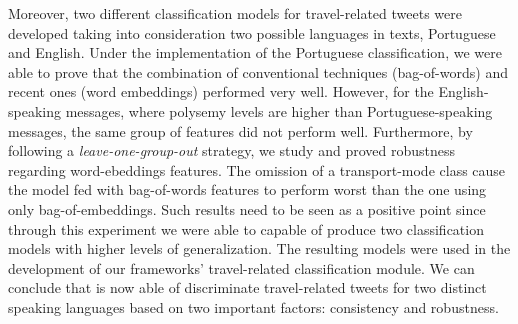 Moreover, two different classification models for travel-related tweets were developed taking into consideration two possible languages in texts, Portuguese and English. Under the implementation of the Portuguese classification, we were able to prove that the combination of conventional techniques (bag-of-words) and recent ones (word embeddings) performed very well. However, for the English-speaking messages, where polysemy levels are higher than Portuguese-speaking messages, the same group of features did not perform well. Furthermore, by following a \textit{leave-one-group-out} strategy, we study and proved robustness regarding word-ebeddings features. The omission of a transport-mode class cause the model fed with bag-of-words features to perform worst than the one using only bag-of-embeddings. Such results need to be seen as a positive point since through this experiment we were able to capable of produce two classification models with higher levels of generalization. The resulting models were used in the development of our frameworks' travel-related classification module. We can conclude that is now able of discriminate travel-related tweets for two distinct speaking languages based on two important factors: consistency and robustness.
